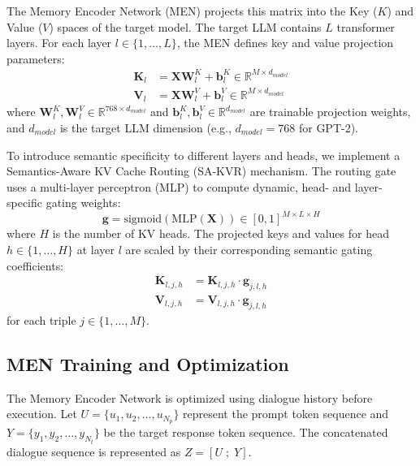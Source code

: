 \documentclass[conference]{IEEEtran}
\begin{document}
The Memory Encoder Network (MEN) projects this matrix into the Key ($K$) and Value ($V$) spaces of the target model. The target LLM contains $L$ transformer layers. For each layer $l \in \{1, \dots, L\}$, the MEN defines key and value projection parameters:
\begin{align}
\mathbf{K}_l &= \mathbf{X} \mathbf{W}^K_l + \mathbf{b}^K_l \in \mathbb{R}^{M \times d_{model}} \\
\mathbf{V}_l &= \mathbf{X} \mathbf{W}^V_l + \mathbf{b}^V_l \in \mathbb{R}^{M \times d_{model}}
\end{align}
where $\mathbf{W}^K_l, \mathbf{W}^V_l \in \mathbb{R}^{768 \times d_{model}}$ and $\mathbf{b}^K_l, \mathbf{b}^V_l \in \mathbb{R}^{d_{model}}$ are trainable projection weights, and $d_{model}$ is the target LLM dimension (e.g., $d_{model} = 768$ for GPT-2).

To introduce semantic specificity to different layers and heads, we implement a Semantics-Aware KV Cache Routing (SA-KVR) mechanism. The routing gate uses a multi-layer perceptron (MLP) to compute dynamic, head- and layer-specific gating weights:
\begin{equation}
\mathbf{g} = \text{sigmoid}(\text{MLP}(\mathbf{X})) \in [0, 1]^{M \times L \times H}
\end{equation}
where $H$ is the number of KV heads. The projected keys and values for head $h \in \{1, \dots, H\}$ at layer $l$ are scaled by their corresponding semantic gating coefficients:
\begin{align}
\mathbf{K}_{l, j, h} &= \mathbf{K}_{l, j, h} \cdot \mathbf{g}_{j, l, h} \\
\mathbf{V}_{l, j, h} &= \mathbf{V}_{l, j, h} \cdot \mathbf{g}_{j, l, h}
\end{align}
for each triple $j \in \{1, \dots, M\}$.

\subsection{MEN Training and Optimization}
The Memory Encoder Network is optimized using dialogue history before execution. Let $U = \{u_1, u_2, \dots, u_{N_p}\}$ represent the prompt token sequence and $Y = \{y_1, y_2, \dots, y_{N_t}\}$ be the target response token sequence. The concatenated dialogue sequence is represented as $Z = [U \;;\; Y]$.
\end{document}
